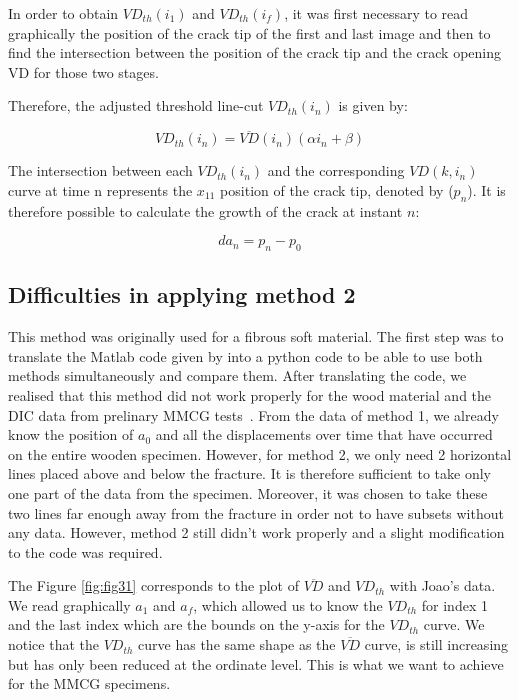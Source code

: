 In order to obtain $VD_{th}(i_1)$ and $VD_{th}(i_f)$, it was first necessary to read graphically the position of the crack tip of the first and last image and then to find the intersection between the position of the crack tip and the crack opening VD for those two stages.

Therefore, the adjusted threshold line-cut $VD_{th}(i_n)$ is given by:

\begin{equation}
	VD_{th}(i_n)=\overline{VD}(i_n)(\alpha i_n +\beta)
	\label{eq:eq26}
\end{equation}

The intersection between each $VD_{th}(i_n)$ and the corresponding $VD(k, i_n)$ curve at time n represents the $x_{11}$ position of the crack tip, denoted by ($p_n$).
It is therefore possible to calculate the growth of the crack at instant $n$:

\begin{equation}
	da_n=p_n-p_0
	\label{eq:eq27}
\end{equation}

\subsection{Difficulties in applying method 2}

This method was originally used for a fibrous soft material. The first step was to translate the Matlab code given by \citep{FilhoJ2022} into a python code to be able to use both methods simultaneously and compare them.
After translating the code, we realised that this method did not work properly for the wood material and the DIC data from prelinary MMCG tests~\citep{MALFAIT2021}.
From the data of method 1, we already know the position of $a_0$ and all the displacements over time that have occurred on the entire wooden specimen. However, for method 2, we only need 2 horizontal lines placed above and below the fracture. It is therefore sufficient to take only one part of the data from the specimen. Moreover, it was chosen to take these two lines far enough away from the fracture in order not to have subsets without any data. However, method 2 still didn't work properly and a slight modification to the code was required.

The Figure \ref{fig:fig31} corresponds to the plot of $\overline{VD}$ and $VD_{th}$ with Joao's data. We read graphically $a_1$ and $a_f$, which allowed us to know the $VD_{th}$ for index 1 and the last index which are the bounds on the y-axis for the $VD_{th}$ curve. We notice that the $VD_{th}$ curve has the same shape as the $\overline{VD}$ curve, is still increasing but has only been reduced at the ordinate level. This is what we want to achieve for the MMCG specimens.

